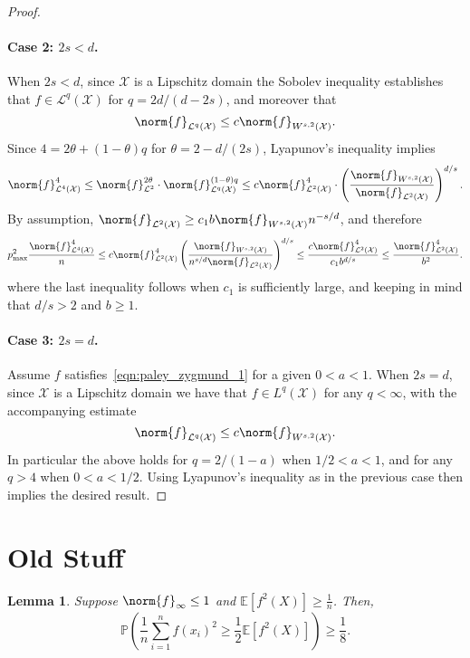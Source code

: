 \documentclass{article}
\newcommand{\1}{\mathbf{1}}
\newcommand{\Xset}{\mathcal{X}}
\newcommand{\Leb}{\mathcal{L}}
\theoremstyle{alden}
\theoremstyle{aldenthm}
\newtheorem{lemma}{Lemma}
\theoremstyle{definition}
\theoremstyle{remark}
\begin{document}
\begin{proof}
	\paragraph{Case 2: $2s < d$.}
	When $2s < d$, since $\Xset$ is a Lipschitz domain the Sobolev inequality establishes that $f \in \Leb^q(\Xset)$ for $q = 2d/(d - 2s)$, and moreover that
	\begin{equation*}
	\norm{f}_{\Leb^q(\Xset)} \leq c \norm{f}_{W^{s,2}(\Xset)}.
	\end{equation*}
	Since $4 = 2\theta + (1 - \theta)q$ for $\theta = 2 - d/(2s)$, Lyapunov's inequality implies
	\begin{equation*}
	\norm{f}_{\Leb^4(\Xset)}^4 \leq \norm{f}_{\Leb^2}^{2\theta} \cdot \norm{f}_{\Leb^q(\Xset)}^{(1 - \theta)q} \leq c \norm{f}_{\Leb^2(\Xset)}^{4} \cdot \left(\frac{\norm{f}_{W^{s,2}(\Xset)}}{\norm{f}_{\Leb^2(\Xset)}}\right)^{d/s}.
	\end{equation*}
	By assumption, $\norm{f}_{\Leb^2(\Xset)} \geq c_1 b \norm{f}_{W^{s,2}(\Xset)} n^{-s/d}$, and therefore
	\begin{equation*}
	p_{\max}^2 \frac{\norm{f}_{\Leb^4(\Xset)}^4}{n} \leq c\norm{f}_{\Leb^2(\Xset)}^4 \left(\frac{\norm{f}_{W^{s,2}(\Xset)}}{n^{s/d}\norm{f}_{\Leb^2(\Xset)}}\right)^{d/s} \leq \frac{c\norm{f}_{\Leb^2(\Xset)}^4}{c_1b^{d/s}} \leq \frac{\norm{f}_{\Leb^2(\Xset)}^4}{b^2}.
	\end{equation*}
	where the last inequality follows when $c_1$ is sufficiently large, and keeping in mind that $d/s > 2$ and $b \geq 1$. 
	
	\paragraph{Case 3: $2s = d$.}
	Assume $f$ satisfies~\eqref{eqn:paley_zygmund_1} for a given $0 < a < 1$. When $2s = d$, since $\Xset$ is a Lipschitz domain we have that $f \in L^q(\Xset)$ for any $q < \infty$, with the accompanying estimate
	\begin{equation*}
	\norm{f}_{\Leb^q(\Xset)} \leq c \norm{f}_{W^{s,2}(\Xset)}.
	\end{equation*}
	In particular the above holds for $q = 2/(1 - a)$ when $1/2 < a < 1$, and for any $q > 4$ when $0 < a < 1/2$. Using Lyapunov's inequality as in the previous case then implies the desired result.
\end{proof}

\clearpage 
\section{Old Stuff}
\begin{lemma}
	\label{lem:empirical_norm_lb}
	Suppose $\norm{f}_{\infty} \leq 1$ and $\mathbb{E}[f^2(X)] \geq \frac{1}{n}$. Then,
	\begin{equation*}
	\mathbb{P}\left(\frac{1}{n}\sum_{i = 1}^{n} f(x_i)^2 \geq \frac{1}{2}\mathbb{E}[f^2(X)]\right) \geq \frac{1}{8}.
	\end{equation*}
\end{lemma}
\end{document}

